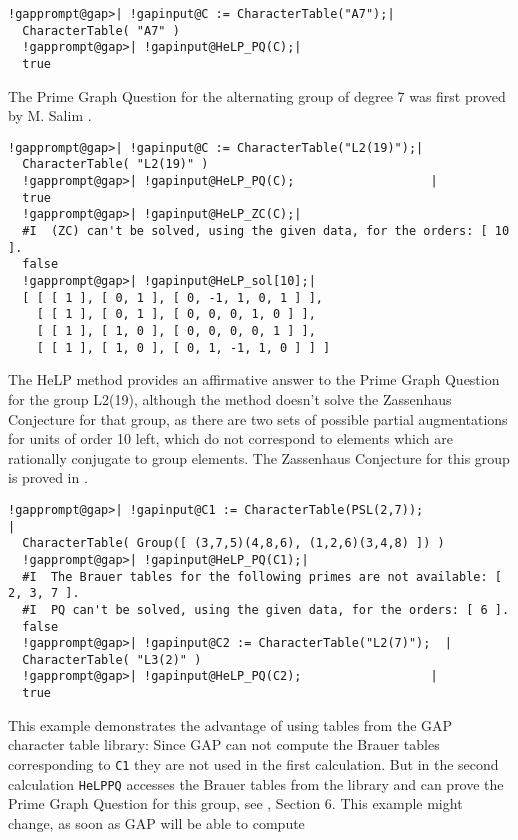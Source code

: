 \documentclass[a4paper,11pt]{report}
\begin{document}
{{ 
\begin{Verbatim}[commandchars=!@|,fontsize=\small,frame=single,label=Example]
  !gapprompt@gap>| !gapinput@C := CharacterTable("A7");|
  CharacterTable( "A7" )
  !gapprompt@gap>| !gapinput@HeLP_PQ(C);|
  true
\end{Verbatim}
 The Prime Graph Question for the alternating group of degree 7 was first
proved by M. Salim \cite{SalimA7A8}. 
\begin{Verbatim}[commandchars=!@|,fontsize=\small,frame=single,label=Example]
  !gapprompt@gap>| !gapinput@C := CharacterTable("L2(19)");|
  CharacterTable( "L2(19)" )
  !gapprompt@gap>| !gapinput@HeLP_PQ(C);                   |
  true
  !gapprompt@gap>| !gapinput@HeLP_ZC(C);|
  #I  (ZC) can't be solved, using the given data, for the orders: [ 10 ].
  false
  !gapprompt@gap>| !gapinput@HeLP_sol[10];|
  [ [ [ 1 ], [ 0, 1 ], [ 0, -1, 1, 0, 1 ] ], 
    [ [ 1 ], [ 0, 1 ], [ 0, 0, 0, 1, 0 ] ], 
    [ [ 1 ], [ 1, 0 ], [ 0, 0, 0, 0, 1 ] ], 
    [ [ 1 ], [ 1, 0 ], [ 0, 1, -1, 1, 0 ] ] ]
\end{Verbatim}
 The HeLP method provides an affirmative answer to the Prime Graph Question for
the group L2(19), although the method doesn't solve the Zassenhaus Conjecture
for that group, as there are two sets of possible partial augmentations for
units of order 10 left, which do not correspond to elements which are
rationally conjugate to group elements. The Zassenhaus Conjecture for this
group is proved in \cite{BaMaM10}. 
\begin{Verbatim}[commandchars=!@|,fontsize=\small,frame=single,label=Example]
  !gapprompt@gap>| !gapinput@C1 := CharacterTable(PSL(2,7));                                  |
  CharacterTable( Group([ (3,7,5)(4,8,6), (1,2,6)(3,4,8) ]) )
  !gapprompt@gap>| !gapinput@HeLP_PQ(C1);|
  #I  The Brauer tables for the following primes are not available: [ 2, 3, 7 ].
  #I  PQ can't be solved, using the given data, for the orders: [ 6 ].
  false
  !gapprompt@gap>| !gapinput@C2 := CharacterTable("L2(7)");  |
  CharacterTable( "L3(2)" )
  !gapprompt@gap>| !gapinput@HeLP_PQ(C2);                  |
  true
\end{Verbatim}
 This example demonstrates the advantage of using tables from the GAP character
table library: Since GAP can not compute the Brauer tables corresponding to \texttt{C1} they are not used in the first calculation. But in the second calculation \texttt{HeLP{\textunderscore}PQ} accesses the Brauer tables from the library and can prove the Prime Graph
Question for this group, see \cite{HertweckBrauer}, Section 6. This example might change, as soon as GAP will be able to compute
}}
\end{document}
